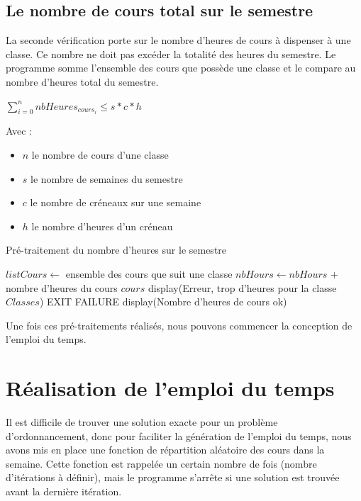 \subsection{Le nombre de cours total sur le semestre}
La seconde vérification porte sur le nombre d'heures de cours à dispenser à une classe. Ce nombre ne doit pas excéder la totalité des heures du semestre. Le programme somme l'ensemble des cours que possède une classe et le compare au nombre d'heures total du semestre.

\begin{center}
$\sum_{i=0}^n nbHeures_{cours_i} \leq s*c*h$
\end{center}

Avec :
\begin{itemize}
\item $n$ le nombre de cours d'une classe
\item $s$ le nombre de semaines du semestre
\item $c$ le nombre de créneaux sur une semaine
\item $h$ le nombre d'heures d'un créneau
\end{itemize}

\newpage

\begin{algorithm}
\caption{Pré-traitement du nombre d'heures sur le semestre}
\begin{algorithmic}
\STATE $listCours \leftarrow$ ensemble des cours que suit une classe
\STATE $nbHours \leftarrow nbHours $ + nombre d'heures du cours $cours$
\ENDFOR
{}
\STATE display(Erreur, trop d'heures pour la classe $Classes$)
\STATE EXIT FAILURE
\ENDIF
\ENDFOR
\STATE display(Nombre d'heures de cours ok)
\end{algorithmic}
\end{algorithm}

Une fois ces pré-traitements réalisés, nous pouvons commencer la conception de l'emploi du temps.

\newpage
\section{Réalisation de l'emploi du temps}
Il est difficile de trouver une solution exacte pour un problème d'ordonnancement, donc pour faciliter la génération de l'emploi du temps, nous avons mis en place une fonction de répartition aléatoire des cours dans la semaine. Cette fonction est rappelée un certain nombre de fois (nombre d'itérations à définir), mais le programme s'arrête si une solution est trouvée avant la dernière itération.\\

